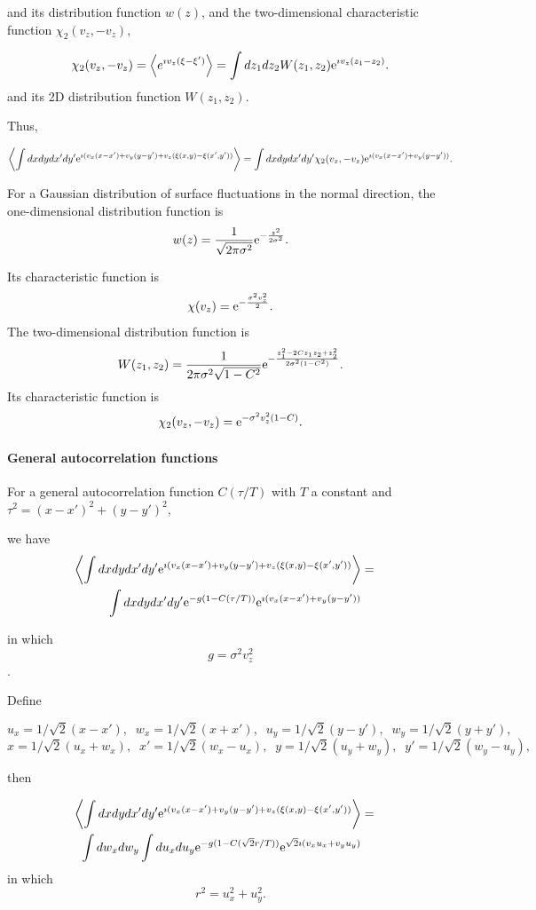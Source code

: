 \documentclass[11pt,openany]{report}
\newcommand{\e}{{\rm e}}
\begin{document}
{{and its distribution function $w(z)$, and the two-dimensional characteristic function $\chi_{2}(v_{z}, -v_{z}),$

$$\chi_{2}(v_{z},-v_{z})=\left<e^{\imath v_{z}(\xi-\xi')}\right>=\int dz_{1} dz_{2} W(z_{1},z_{2}) \e^{\imath v_{z}(z_{1}-z_{2})}.$$
 and its 2D distribution function
 $W(z_{1},z_{2})$.
 
 Thus,
 
 $$\left<\int dx dydx'dy'\e^{\imath( v_{x}(x-x')+v_{y}(y-y')+v_{z}(\xi(x,y)-\xi(x',y'))}\right>=\int dx dydx'dy'\chi_{2}(v_{z},-v_{z})\e^{\imath( v_{x}(x-x')+v_{y}(y-y'))}.$$

 For a Gaussian distribution of surface fluctuations in the normal direction, the one-dimensional distribution function is
 $$w(z)=\frac{1}{\sqrt{2\pi\sigma^{2}}}\e^{-\frac{z^{2}}{2\sigma^{2}}}.$$
 
 Its characteristic function is
 $$\chi(v_{z})=\e^{-\frac{\sigma^{2}v_{z}^{2}}{2}}.$$
 The two-dimensional distribution function is
  $$W(z_{1},z_{2})=\frac{1}{2\pi\sigma^{2}\sqrt{1-C^{2}}}\e^{-\frac{z_{1}^{2}-2Cz_{1}z_{2}+z_{2}^{2}}{2\sigma^{2}(1-C^{2})}}.$$
  Its characteristic function is
 $$\chi_{2}(v_{z},-v_{z})=\e^{-\sigma^{2}v_{z}^{2}(1-C)}.$$
  \paragraph{General autocorrelation functions}

 For a general autocorrelation function $C(\tau/T)$
 with $T$ a constant and $\tau^{2}=(x-x')^{2}+(y-y')^{2},$
 
 we have
\begin{eqnarray}
\left<\int dx dydx'dy'\e^{\imath( v_{x}(x-x')+v_{y}(y-y')+v_{z}(\xi(x,y)-\xi(x',y'))}\right>&=&\\
\int dx dydx'dy'\e^{-g(1-C(\tau/T))}\e^{\imath( v_{x}(x-x')+v_{y}(y-y'))}\end{eqnarray}

in which
$$g=\sigma^{2}v_{z}^{2}$$.

Define

$$u_{x}=1/\sqrt{2}(x-x'),\;\;w_{x}=1/\sqrt{2}(x+x'),\;\;u_{y}=1/\sqrt{2}(y-y'),\;\;w_{y}=1/\sqrt{2}(y+y'),$$
$$x=1/\sqrt{2}(u_{x}+w_{x}),\;\;x'=1/\sqrt{2}(w_{x}-u_{x}),\;\;y=1/\sqrt{2}(u_{y}+w_{y}),\;\;y'=1/\sqrt{2}(w_{y}-u_{y}),$$

then

\begin{eqnarray}
\left<\int dx dydx'dy'\e^{\imath( v_{x}(x-x')+v_{y}(y-y')+v_{z}(\xi(x,y)-\xi(x',y'))}\right>&=&\\
\int dw_{x}dw_{y}\int du_{x} du_{y}\e^{-g(1-C(\sqrt{2}r/T))}\e^{\sqrt{2}\imath( v_{x}u_{x}+v_{y}u_{y})}\end{eqnarray}
 in which
 $$r^{2}=u_{x}^{2}+u_{y}^{2}.$$

}}
\end{document}
